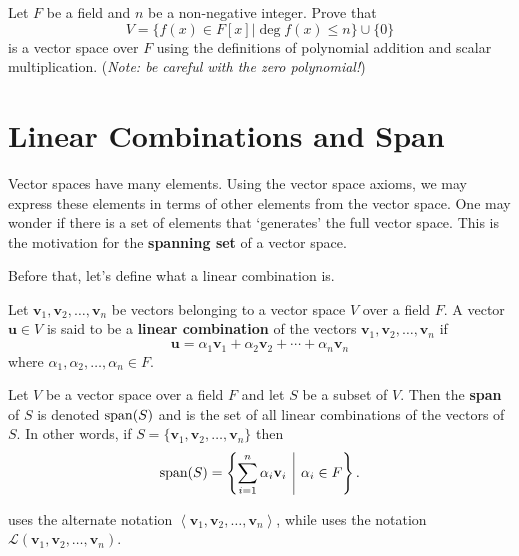 \begin{exercise}
    Let $F$ be a field and $n$ be a non-negative integer. Prove that
    \[
        V = \{f(x) \in F[x] \vert \deg f(x) \leq n\} \cup \{0\}
    \]
    is a vector space over $F$ using the definitions of polynomial addition and scalar multiplication.\newline
    (\textit{Note: be careful with the zero polynomial!})
\end{exercise}

\section{Linear Combinations and Span}
Vector spaces have many elements. Using the vector space axioms, we may express these elements in terms of other elements from the vector space. One may wonder if there is a set of elements that `generates' the full vector space. This is the motivation for the \textbf{spanning set} of a vector space.

Before that, let's define what a linear combination is.
\begin{definition}
    Let $\textbf{v}_1, \textbf{v}_2, \dots, \textbf{v}_n$ be vectors belonging to a vector space $V$ over a field $F$. A vector $\textbf{u} \in V$ is said to be a \textbf{linear combination} of the vectors $\textbf{v}_1, \textbf{v}_2, \dots, \textbf{v}_n$ if
    \[
        \textbf{u} = \alpha_1\textbf{v}_1 + \alpha_2\textbf{v}_2 + \cdots + \alpha_n \textbf{v}_n
    \]
    where $\alpha_1, \alpha_2, \dots, \alpha_n \in F$.
\end{definition}

\begin{definition}
    Let $V$ be a vector space over a field $F$ and let $S$ be a subset of $V$. Then the \textbf{span} of $S$ is denoted $\mathrm{span}(S)$ and is the set of all linear combinations of the vectors of $S$. In other words, if $S = \{\textbf{v}_1, \textbf{v}_2, \dots, \textbf{v}_n\}$ then
    \[
        \Span{S} = \left\{\sum_{i=1}^n \alpha_i\textbf{v}_i \vert \alpha_i \in F\right\}.
    \]
\end{definition}
\begin{remark}
    \cite[p.~331]{gallian_2016} uses the alternate notation $\left\langle\textbf{v}_1, \textbf{v}_2, \dots, \textbf{v}_n\right\rangle$, while \cite[p.~31]{treil_2017} uses the notation $\mathcal{L}\left(\textbf{v}_1, \textbf{v}_2, \dots, \textbf{v}_n\right)$.
\end{remark}

